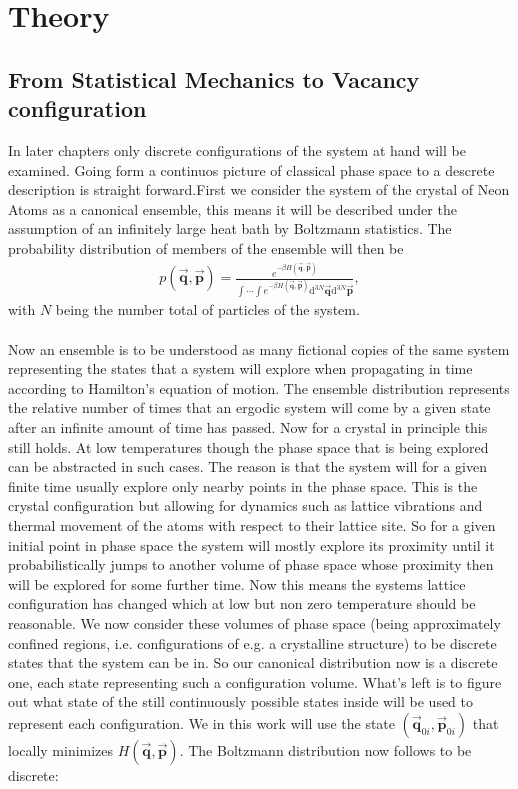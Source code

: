 \chapter{Theory}
\label{chap:Theory}
%
\section{From Statistical Mechanics to Vacancy configuration} In later chapters only discrete configurations of the system at hand will be examined. Going form a continuos picture of classical phase space to a descrete description is straight forward.First we consider the system of the crystal of Neon Atoms as a canonical ensemble, this means it will be described under the assumption of an infinitely large heat bath by Boltzmann statistics. The probability distribution of members of the ensemble will then be 
\begin{align}
	p(\vec{\mathbf{q}},\vec{\mathbf{p}})=\frac{e^{-\beta H(\vec{\mathbf{q}},\vec{\mathbf{p}})}}{\int\cdots\int e^{-\beta H(\vec{\mathbf{q}},\vec{\mathbf{p}})}\mathrm{d}^{3N}\vec{\mathbf{q}}\mathrm{d}^{3N}\vec{\mathbf{p}}},
\end{align}
with $N$ being the number total of particles of the system.\\\\
Now an ensemble is to be understood as many fictional copies of the same system representing the states that a system will explore when propagating in time according to Hamilton's equation of motion. The ensemble distribution represents the relative number of times that an ergodic system will come by a given state after an infinite amount of time has passed. Now for a crystal in principle this still holds. At low temperatures though the phase space that is being explored can be abstracted in such cases. The reason is that the system will for a given finite time usually explore only nearby points in the phase space. This is the crystal configuration but allowing for dynamics such as lattice vibrations and thermal movement of the atoms with respect to their lattice site. So for a given initial point in phase space the system will mostly explore its proximity until it probabilistically jumps to another volume of phase space whose proximity then will be explored for some further time. Now this means the systems lattice configuration has changed which at low but non zero temperature should be reasonable. 
We now consider these volumes of phase space (being approximately confined regions, i.e. configurations of e.g. a crystalline structure) to be discrete states that the system can be in. So our canonical distribution now is a discrete one, each state representing such a configuration volume. What's left is to figure out what state of the still continuously possible states inside will be used to represent each configuration. We in this work will use the state $(\vec{\mathbf{q}}_{0i},\vec{\mathbf{p}}_{0i})$ that locally minimizes $H(\vec{\mathbf{q}},\vec{\mathbf{p}})$. The Boltzmann distribution now follows to be discrete:
